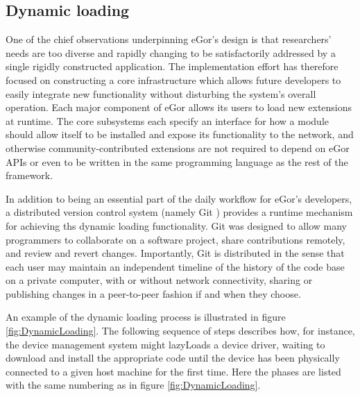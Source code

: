 \documentclass[../thesis]{subfiles}
\begin{document}
\subsection{Dynamic loading}
One of the chief observations underpinning eGor's design is that
researchers' needs are too diverse and rapidly changing to be
satisfactorily addressed by a single rigidly constructed
application. The implementation effort has therefore focused on
constructing a core infrastructure which allows future developers to
easily integrate new functionality without disturbing the system's
overall operation. Each major component of eGor allows its users to
load new extensions at runtime. The core subsystems each specify an
interface for how a module should allow itself to be installed and
expose its functionality to the network, and otherwise
community-contributed extensions are not required to depend on eGor
APIs or even to be written in the same programming language as the
rest of the framework.

In addition to being an essential part of the daily workflow for
eGor's developers, a distributed version control system (namely Git
\cite{Git}) provides a runtime mechanism for achieving ths dynamic
loading functionality. Git was designed to allow many programmers to
collaborate on a software project, share contributions remotely, and
review and revert changes. Importantly, Git is distributed in the
sense that each user may maintain an independent timeline of the
history of the code base on a private computer, with or without
network connectivity, sharing or publishing changes in a peer-to-peer
fashion if and when they choose.

An example of the dynamic loading process is illustrated in figure
\ref{fig:DynamicLoading}. The following sequence of steps describes
how, for instance, the device management system might \glspl{lazyLoad} a
device driver, waiting to download and install the appropriate code
until the device has been physically connected to a given host machine
for the first time. Here the phases are listed with the same numbering
as in figure \ref{fig:DynamicLoading}.
\end{document}
